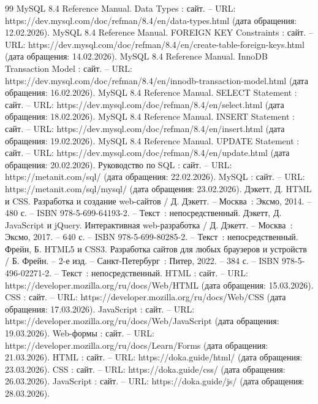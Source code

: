 \begin{thebibliography}{99}
	 MySQL 8.4 Reference Manual. Data Types : сайт. -- URL: https://dev.mysql.com/doc/refman/8.4/en/data-types.html (дата обращения: 12.02.2026).
	 MySQL 8.4 Reference Manual. FOREIGN KEY Constraints : сайт. -- URL: https://dev.mysql.com/doc/refman/8.4/en/create-table-foreign-keys.html (дата обращения: 14.02.2026).
	 MySQL 8.4 Reference Manual. InnoDB Transaction Model : сайт. -- URL: https://dev.mysql.com/doc/refman/8.4/en/innodb-transaction-model.html (дата обращения: 16.02.2026).
	 MySQL 8.4 Reference Manual. SELECT Statement : сайт. -- URL: https://dev.mysql.com/doc/refman/8.4/en/select.html (дата обращения: 18.02.2026).
	 MySQL 8.4 Reference Manual. INSERT Statement : сайт. -- URL: https://dev.mysql.com/doc/refman/8.4/en/insert.html (дата обращения: 19.02.2026).
	 MySQL 8.4 Reference Manual. UPDATE Statement : сайт. -- URL: https://dev.mysql.com/doc/refman/8.4/en/update.html (дата обращения: 20.02.2026).
	 Руководство по SQL : сайт. -- URL: https://metanit.com/sql/ (дата обращения: 22.02.2026).
	 MySQL : сайт. -- URL: https://metanit.com/sql/mysql/ (дата обращения: 23.02.2026).
	 Дэкетт, Д. HTML и CSS. Разработка и создание web-сайтов / Д. Дэкетт. -- Москва~: Эксмо, 2014. -- 480 с. -- ISBN 978-5-699-64193-2. -- Текст~: непосредственный.
	 Дэкетт, Д. JavaScript и jQuery. Интерактивная web-разработка / Д. Дэкетт. -- Москва~: Эксмо, 2017. -- 640 с. -- ISBN 978-5-699-80285-2. -- Текст~: непосредственный.
	 Фрейн, Б. HTML5 и CSS3. Разработка сайтов для любых браузеров и устройств / Б. Фрейн. -- 2-е изд. -- Санкт-Петербург~: Питер, 2022. -- 384 с. -- ISBN 978-5-496-02271-2. -- Текст~: непосредственный.
	 HTML : сайт. -- URL: https://developer.mozilla.org/ru/docs/Web/HTML (дата обращения: 15.03.2026).
	 CSS : сайт. -- URL: https://developer.mozilla.org/ru/docs/Web/CSS (дата обращения: 17.03.2026).
	 JavaScript : сайт. -- URL: https://developer.mozilla.org/ru/docs/Web/\allowbreak JavaScript (дата обращения: 19.03.2026).
	 Web-формы : сайт. -- URL: https://developer.mozilla.org/ru/docs/Learn/\allowbreak Forms (дата обращения: 21.03.2026).
	 HTML : сайт. -- URL: https://doka.guide/html/ (дата обращения: 23.03.2026).
	 CSS : сайт. -- URL: https://doka.guide/css/ (дата обращения: 26.03.2026).
	 JavaScript : сайт. -- URL: https://doka.guide/js/ (дата обращения: 28.03.2026).

\end{thebibliography}
